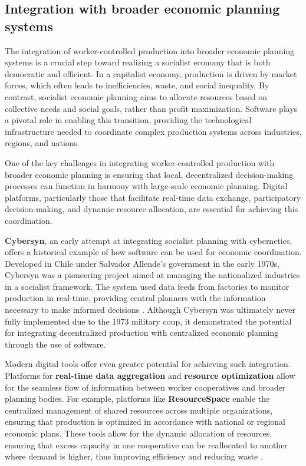 \begin{refsection}
\subsection{Integration with broader economic planning systems}

The integration of worker-controlled production into broader economic planning systems is a crucial step toward realizing a socialist economy that is both democratic and efficient. In a capitalist economy, production is driven by market forces, which often leads to inefficiencies, waste, and social inequality. By contrast, socialist economic planning aims to allocate resources based on collective needs and social goals, rather than profit maximization. Software plays a pivotal role in enabling this transition, providing the technological infrastructure needed to coordinate complex production systems across industries, regions, and nations.

One of the key challenges in integrating worker-controlled production with broader economic planning is ensuring that local, decentralized decision-making processes can function in harmony with large-scale economic planning. Digital platforms, particularly those that facilitate real-time data exchange, participatory decision-making, and dynamic resource allocation, are essential for achieving this coordination.

\textbf{Cybersyn}, an early attempt at integrating socialist planning with cybernetics, offers a historical example of how software can be used for economic coordination. Developed in Chile under Salvador Allende’s government in the early 1970s, Cybersyn was a pioneering project aimed at managing the nationalized industries in a socialist framework. The system used data feeds from factories to monitor production in real-time, providing central planners with the information necessary to make informed decisions \cite[pp.~92-95]{medina2011}. Although Cybersyn was ultimately never fully implemented due to the 1973 military coup, it demonstrated the potential for integrating decentralized production with centralized economic planning through the use of software.

Modern digital tools offer even greater potential for achieving such integration. Platforms for \textbf{real-time data aggregation} and \textbf{resource optimization} allow for the seamless flow of information between worker cooperatives and broader planning bodies. For example, platforms like \textbf{ResourceSpace} enable the centralized management of shared resources across multiple organizations, ensuring that production is optimized in accordance with national or regional economic plans. These tools allow for the dynamic allocation of resources, ensuring that excess capacity in one cooperative can be reallocated to another where demand is higher, thus improving efficiency and reducing waste \cite[pp.~121-125]{schweickart2011}.


\end{refsection}
